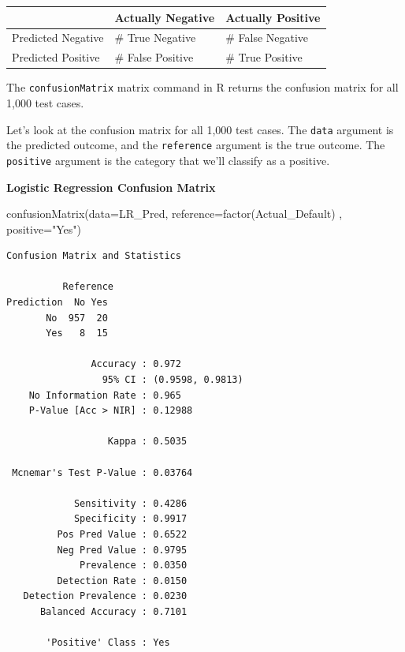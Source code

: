 \documentclass[
  letterpaper,
  DIV=11,
  numbers=noendperiod]{scrreprt}
\newenvironment{Shaded}{\begin{snugshade}}{\end{snugshade}}
\newcommand{\AttributeTok}[1]{\textcolor[rgb]{0.40,0.45,0.13}{#1}}
\newcommand{\FunctionTok}[1]{\textcolor[rgb]{0.28,0.35,0.67}{#1}}
\newcommand{\NormalTok}[1]{\textcolor[rgb]{0.00,0.23,0.31}{#1}}
\newcommand{\StringTok}[1]{\textcolor[rgb]{0.13,0.47,0.30}{#1}}
\begin{document}
\begin{longtable}[]{@{}lll@{}}
\toprule\noalign{}
& Actually Negative & Actually Positive \\
\midrule\noalign{}
\endhead
\bottomrule\noalign{}
\endlastfoot
Predicted Negative & \# True Negative & \# False Negative \\
Predicted Positive & \# False Positive & \# True Positive \\
\end{longtable}

The \texttt{confusionMatrix} matrix command in R returns the confusion
matrix for all 1,000 test cases.

Let's look at the confusion matrix for all 1,000 test cases. The
\texttt{data} argument is the predicted outcome, and the
\texttt{reference} argument is the true outcome. The \texttt{positive}
argument is the category that we'll classify as a positive.

\textbf{Logistic Regression Confusion Matrix}

\begin{Shaded}
\begin{Highlighting}[]
\FunctionTok{confusionMatrix}\NormalTok{(}\AttributeTok{data=}\NormalTok{LR\_Pred, }\AttributeTok{reference=}\FunctionTok{factor}\NormalTok{(Actual\_Default) , }\AttributeTok{positive=}\StringTok{"Yes"}\NormalTok{)}
\end{Highlighting}
\end{Shaded}

\begin{verbatim}
Confusion Matrix and Statistics

          Reference
Prediction  No Yes
       No  957  20
       Yes   8  15
                                          
               Accuracy : 0.972           
                 95% CI : (0.9598, 0.9813)
    No Information Rate : 0.965           
    P-Value [Acc > NIR] : 0.12988         
                                          
                  Kappa : 0.5035          
                                          
 Mcnemar's Test P-Value : 0.03764         
                                          
            Sensitivity : 0.4286          
            Specificity : 0.9917          
         Pos Pred Value : 0.6522          
         Neg Pred Value : 0.9795          
             Prevalence : 0.0350          
         Detection Rate : 0.0150          
   Detection Prevalence : 0.0230          
      Balanced Accuracy : 0.7101          
                                          
       'Positive' Class : Yes             
                                          
\end{verbatim}
\end{document}
